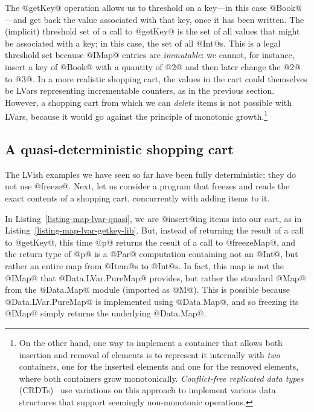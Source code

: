 The @getKey@ operation allows us to threshold on a key---in this case
@Book@---and get back the value associated with that key, once it has
been written.  The (implicit) threshold set of a call to @getKey@ is
the set of all values that might be associated with a key; in this
case, the set of all @Int@s.  This is a legal threshold set because
@IMap@ entries are \emph{immutable}: we cannot, for instance, insert a
key of @Book@ with a quantity of @2@ and then later change the @2@ to
@3@.  In a more realistic shopping cart, the values in the cart could
themselves be LVars representing incrementable counters, as in the
previous section.  However, a shopping cart from which we can
\emph{delete} items is not possible with LVars, because it would go
against the principle of monotonic growth.\footnote{On the other hand,
  one way to implement a container that allows both insertion and
  removal of elements is to represent it internally with \emph{two}
  containers, one for the inserted elements and one for the removed
  elements, where both containers grow monotonically.
  \emph{Conflict-free replicated data types} (CRDTs)~\cite{crdts} use
  variations on this approach to implement various data structures
  that support seemingly non-monotonic operations.  }

\subsection{A quasi-deterministic shopping cart}

The LVish examples we have seen so far have been fully deterministic;
they do not use @freeze@.  Next, let us consider a program that
freezes and reads the exact contents of a shopping cart, concurrently
with adding items to it.

\singlespacing

\doublespacing

In Listing~\ref{listing-map-lvar-quasi}, we are @insert@ing items into
our cart, as in Listing~\ref{listing-map-lvar-getkey-lib}.  But,
instead of returning the result of a call to @getKey@, this time @p@
returns the result of a call to @freezeMap@, and the return type of
@p@ is a @Par@ computation containing not an @Int@, but rather an
entire map from @Item@s to @Int@s.  In fact, this map is not the
@IMap@ that @Data.LVar.PureMap@ provides, but rather the standard
@Map@ from the @Data.Map@ module (imported as @M@).  This is possible
because @Data.LVar.PureMap@ is implemented using @Data.Map@, and so
freezing its @IMap@ simply returns the underlying @Data.Map@.

